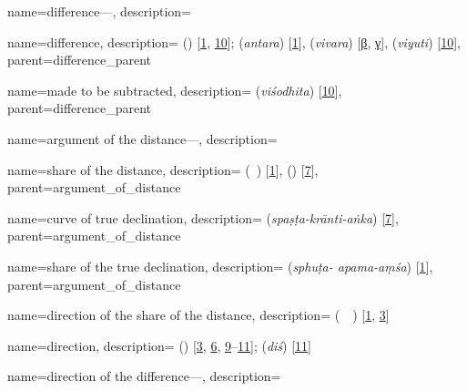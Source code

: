 {
        name={difference---},
        description={\phantom{x}\nopagebreak}
}

{
        name={difference},
        description={ (\tafadul) [\hyperlink{PEpass1}{1}, \hyperlink{PEpass10}{10}];   (\textit{antara}) [\hyperlink{SEpass1}{1}],  (\textit{vivara}) [\hyperlink{SEpassB}{β}, \hyperlink{SEpassC}{γ}],  (\textit{viyuti})} [\hyperlink{SEpass10}{10}],
        parent={difference_parent}
}

{
        name={made to be subtracted},
        description={ (\textit{viśodhita}) [\hyperlink{SEpass10}{10}]},
        parent={difference_parent}
}

{
        name={argument of the distance---},
        description={\phantom{x}\nopagebreak}
}

{
        name={share of the distance},
        description={ (\hissi\idafavowel\ \bud) [\hyperlink{PEpass1}{1}],  (\hissatalbud) [\hyperlink{PEpass7}{7}]},
        parent={argument_of_distance}
}

{
        name={curve of true declination},
        description={ (\textit{spaṣṭa-krānti-aṅka}) [\hyperlink{SEpass7}{7}]},
        parent={argument_of_distance}
}

{
        name={share of the true declination},
        description={ (\textit{sphuṭa- apama-aṃśa}) [\hyperlink{SEpass1}{1}]},
        parent={argument_of_distance}
}


{
        name={direction of the share of the distance},
        description={ (\jahat\idafaconsonant\ \hissi\idafavowel\ \bud) [\hyperlink{PEpass1}{1}, \hyperlink{PEpass3}{3}]}
}

{
        name={direction},
        description={ (\jahat) [\hyperlink{PEpass3}{3}, \hyperlink{PEpass6}{6}, \hyperlink{PEpass9}{9}--\hyperlink{PEpass11}{11}];  (\textit{diś}) [\hyperlink{SEpass11}{11}]}
}

{
        name={direction of the difference---},
        description={\phantom{x}\nopagebreak}
}

